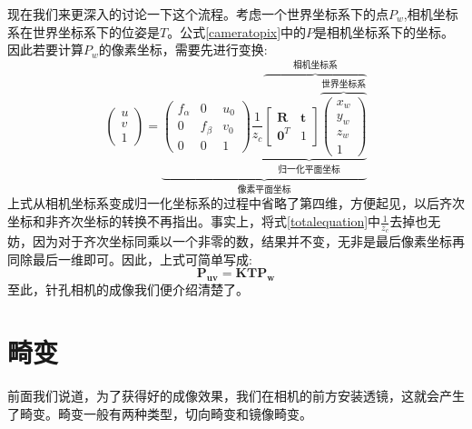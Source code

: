 现在我们来更深入的讨论一下这个流程。考虑一个世界坐标系下的点$P_w$,相机坐标系在世界坐标系下的位姿是$T$。公式\ref{cameratopix}中的$P$是相机坐标系下的坐标。因此若要计算$P_w$的像素坐标，需要先进行变换:
\begin{equation}
\left( \begin{array}{c}{u} \\ {v} \\ {1}\end{array}\right)=
\underbrace{
\left( \begin{array}{ccc}{f_{\alpha}} & {0} & {u_{0}} \\ {0} & {f_{\beta}} & {v_{0}} \\ {0} & {0} & {1}\end{array}\right)
\underbrace{\frac{1}{z_{c}}\overbrace{\left[ \begin{array}{cc}{\boldsymbol{R}} & {\boldsymbol{t}} \\ {\boldsymbol{0}^{T}} & {1}\end{array}\right]
\overbrace{\left( \begin{array}{c}{x_{w}} \\ {y_{w}} \\ {z_{w}} \\ {1}\end{array}\right)}^\text{世界坐标系}}^\text{相机坐标系}}_\text{归一化平面坐标}}_\text{像素平面坐标}\label{totalequation}
\end{equation}
上式从相机坐标系变成归一化坐标系的过程中省略了第四维，方便起见，以后齐次坐标和非齐次坐标的转换不再指出。事实上，将式\ref{totalequation}中$\frac{1}{z_c}$去掉也无妨，因为对于齐次坐标同乘以一个非零的数，结果并不变，无非是最后像素坐标再同除最后一维即可。因此，上式可简单写成:
\begin{equation}
	\boldsymbol{P_{uv}=KTP_w}
\end{equation}
至此，针孔相机的成像我们便介绍清楚了。
\section{畸变}
前面我们说道，为了获得好的成像效果，我们在相机的前方安装透镜，这就会产生了畸变。畸变一般有两种类型，切向畸变和镜像畸变。

